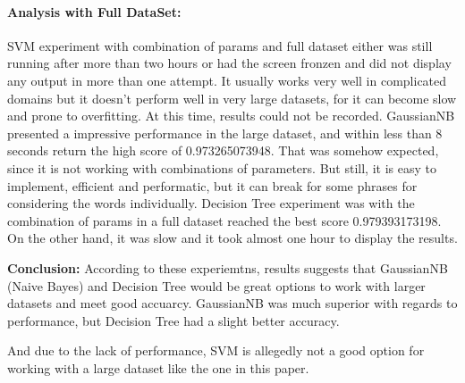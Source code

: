 \documentclass[11pt]{article}
\begin{document}
\begin{multicols}{2}
\paragraph{Analysis with Full
DataSet:}\label{analysis-with-full-dataset}

SVM experiment with combination of params and full dataset either was
still running after more than two hours or had the screen fronzen and
did not display any output in more than one attempt. It usually works
very well in complicated domains but it doesn't perform well in very
large datasets, for it can become slow and prone to overfitting. At this
time, results could not be recorded. GaussianNB presented a impressive
performance in the large dataset, and within less than 8 seconds return
the high score of 0.973265073948. That was somehow expected, since it is
not working with combinations of parameters. But still, it is easy to
implement, efficient and performatic, but it can break for some phrases
for considering the words individually. Decision Tree experiment was
with the combination of params in a full dataset reached the best score
0.979393173198. On the other hand, it was slow and it took almost one
hour to display the results.

\textbf{Conclusion:} According to these experiemtns, results suggests
that GaussianNB (Naive Bayes) and Decision Tree would be great options
to work with larger datasets and meet good accuarcy. GaussianNB was much
superior with regards to performance, but Decision Tree had a slight
better accuracy.

And due to the lack of performance, SVM is allegedly not a good option
for working with a large dataset like the one in this paper.


    



    
     \end{multicols}
    
    
\end{document}
